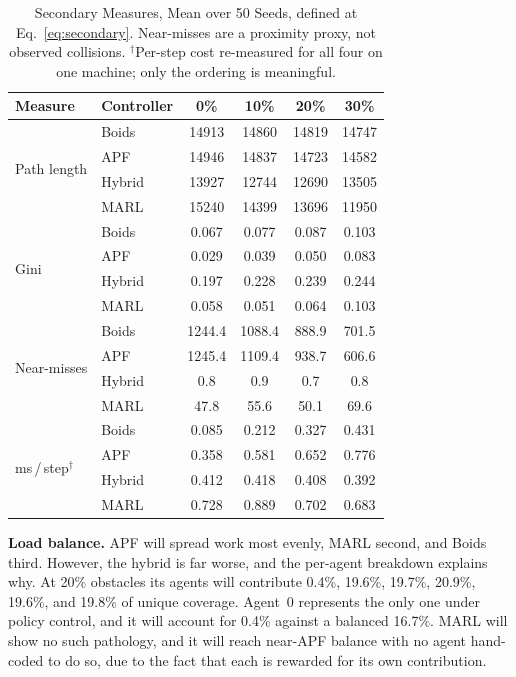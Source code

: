 \documentclass[a4paper, 10pt, conference]{ieeeconf}
\begin{document}
\begin{table}[htb]
\centering
\caption{Secondary Measures, Mean over 50 Seeds, defined at
Eq.~\ref{eq:secondary}. Near-misses are a proximity proxy, not
observed collisions. $^\dagger$Per-step cost re-measured for all four
on one machine; only the ordering is meaningful.}
\label{tab:extended}
\scriptsize
\setlength{\tabcolsep}{3pt}
\begin{tabular}{llcccc}
\toprule
\textbf{Measure} & \textbf{Controller} & \textbf{0\%} & \textbf{10\%} &
\textbf{20\%} & \textbf{30\%} \\
\midrule
\multirow{4}{*}{Path length}
 & Boids  & 14913 & 14860 & 14819 & 14747 \\
 & APF    & 14946 & 14837 & 14723 & 14582 \\
 & Hybrid & 13927 & 12744 & 12690 & 13505 \\
 & MARL   & 15240 & 14399 & 13696 & 11950 \\
\midrule
\multirow{4}{*}{Gini}
 & Boids  & 0.067 & 0.077 & 0.087 & 0.103 \\
 & APF    & 0.029 & 0.039 & 0.050 & 0.083 \\
 & Hybrid & 0.197 & 0.228 & 0.239 & 0.244 \\
 & MARL   & 0.058 & 0.051 & 0.064 & 0.103 \\
\midrule
\multirow{4}{*}{Near-misses}
 & Boids  & 1244.4 & 1088.4 & 888.9 & 701.5 \\
 & APF    & 1245.4 & 1109.4 & 938.7 & 606.6 \\
 & Hybrid & 0.8    & 0.9    & 0.7   & 0.8   \\
 & MARL   & 47.8   & 55.6   & 50.1  & 69.6  \\
\midrule
\multirow{4}{*}{ms\,/\,step$^\dagger$}
 & Boids  & 0.085 & 0.212 & 0.327 & 0.431 \\
 & APF    & 0.358 & 0.581 & 0.652 & 0.776 \\
 & Hybrid & 0.412 & 0.418 & 0.408 & 0.392 \\
 & MARL   & 0.728 & 0.889 & 0.702 & 0.683 \\
\bottomrule
\end{tabular}
\end{table}

\textbf{Load balance.} APF will spread work most evenly, MARL second,
and Boids third. However, the hybrid is far worse, and the per-agent
breakdown explains why. At 20\% obstacles its agents will contribute
0.4\%, 19.6\%, 19.7\%, 20.9\%, 19.6\%, and 19.8\% of unique coverage.
Agent~0 represents the only one under policy control, and it will
account for 0.4\% against a balanced 16.7\%. MARL will show no such
pathology, and it will reach near-APF balance with no agent hand-coded
to do so, due to the fact that each is rewarded for its own
contribution.
\end{document}
